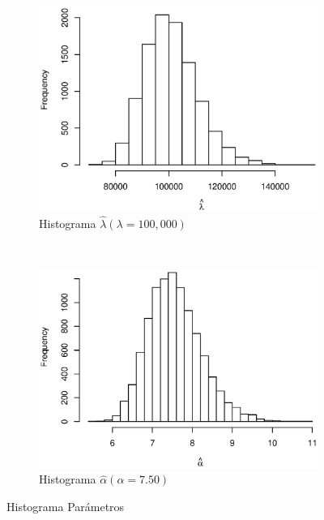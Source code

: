 \documentclass[11pt]{article}
\numberwithin{equation}{section} %
\begin{document}
\begin{figure}[htbp]
\begin{subfigure}[b]{0.5\textwidth}
\centering
\includegraphics[width=\textwidth, trim=0 0.5cm 0 1cm]{histl.eps}
\caption{Histograma $\hat{\lambda} (\lambda=100,000)$}
\label{fig:histl}
\end{subfigure}%
~ %
\begin{subfigure}[b]{0.5\textwidth}
\centering
\includegraphics[width=\textwidth, trim=0 0.5cm 0 1cm]{hista.eps}
\caption{Histograma $\hat{\alpha} (\alpha=7.50)$}
\label{fig:hista}
\end{subfigure}


\caption{Histograma Parámetros}
\label{fig:histparams}
\end{figure}
\end{document}
